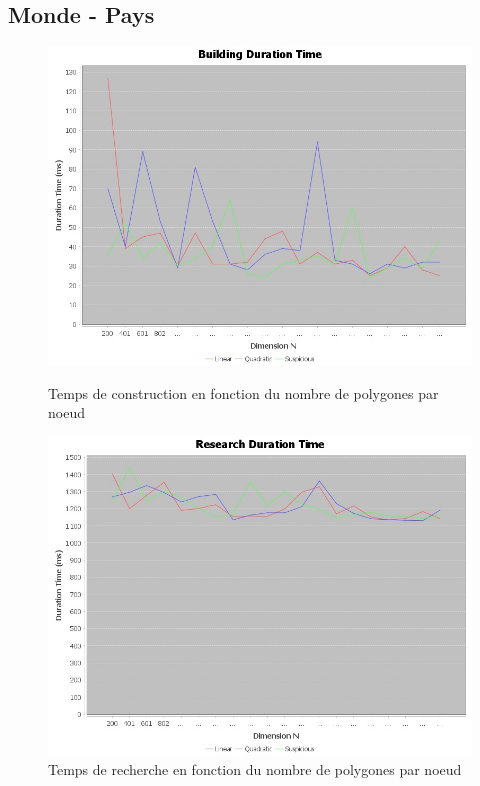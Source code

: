\documentclass {article}
\begin{document}

\subsection {Monde - Pays}\label{mondePays}

\begin{figure}[h]
    \begin{minipage}[t]{0.46\textwidth}
	\centering
	\includegraphics[width=\textwidth]{building_graph_world.png}
	\caption{Temps de construction en fonction du nombre de polygones par noeud}
	\label{fig:belgique_stat_find_lin}
    \end{minipage}
    \begin{minipage}[t]{0.46\textwidth}
	\centering
	\includegraphics[width=\textwidth]{research_graph_world.png}
	\caption{Temps de recherche en fonction du nombre de polygones par noeud}
	\label{fig:belgique_stat_find_quad}
    \end{minipage}
\end{figure}
\end{document}
